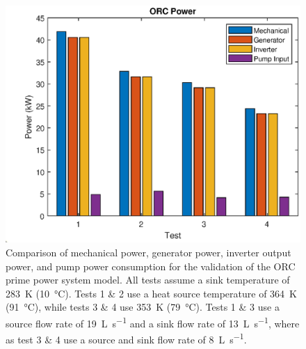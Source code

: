 \begin{figure}[h]
	\centering
	
	\includegraphics[width=\textwidth]{figures/VerificationPower01}
	
	\caption{Comparison of mechanical power, generator power, inverter output power, and pump power consumption for the validation of the ORC prime power system model. All tests assume a sink temperature of \SI{283}{\kelvin} (\SI{10}{\degreeCelsius}). Tests 1 \& 2 use a heat source temperature of \SI{364}{\kelvin} (\SI{91}{\degreeCelsius}), while tests 3 \& 4 use \SI{353}{\kelvin} (\SI{79}{\degreeCelsius}). Tests 1 \& 3 use a source flow rate of \SI{19}{\liter\per\second} and a sink flow rate of \SI{13}{\liter\per\second}, where as test 3 \& 4 use a source and sink flow rate of \SI{8}{\liter\per\second}.
	}
	\label{fig:verificationPower01}
\end{figure}